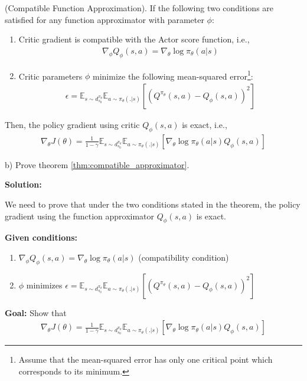 \begin{theorem}\label{thm:compatible_approximator}
    (Compatible Function Approximation). If the following two conditions are satisfied for any function approximator with parameter $\phi$:
    \begin{enumerate}
        \item Critic gradient is compatible with the Actor score function, i.e., 
        \begin{align*}
            \nabla_{\phi} Q_\phi(s, a) = \nabla_\theta \log \pi_\theta (a|s)
        \end{align*}
        \item Critic parameters $\phi$ minimize the following mean-squared error\footnote{Assume that the mean-squared error has only one critical point which corresponds to its minimum.}: 
        \begin{align*}
            \epsilon = \mathbb{E}_{s \sim d^{\pi_\theta}_{s_0}}\mathbb{E}_{a \sim \pi_\theta(.|s)} [(Q^{\pi_\theta} (s, a) - Q_\phi(s, a))^2]
        \end{align*}
    \end{enumerate}
    Then, the policy gradient using critic $Q_\phi(s, a)$ is exact, i.e., 
    \begin{align*}
            \nabla_\theta J(\theta) = \frac{1}{1-\gamma}\mathbb{E}_{s \sim d^{\pi_\theta}_{s_0}}\mathbb{E}_{a \sim \pi_\theta(.|s)} [\nabla_\theta \log \pi_\theta (a|s) Q_\phi (s, a)]
    \end{align*}
\end{theorem}

b) Prove theorem \ref{thm:compatible_approximator}.

\textbf{Solution:}

We need to prove that under the two conditions stated in the theorem, the policy gradient using the function approximator $Q_\phi(s,a)$ is exact.

\textbf{Given conditions:}
\begin{enumerate}
    \item $\nabla_{\phi} Q_\phi(s, a) = \nabla_\theta \log \pi_\theta (a|s)$ (compatibility condition)
    \item $\phi$ minimizes $\epsilon = \mathbb{E}_{s \sim d^{\pi_\theta}_{s_0}}\mathbb{E}_{a \sim \pi_\theta(.|s)} [(Q^{\pi_\theta} (s, a) - Q_\phi(s, a))^2]$
\end{enumerate}

\textbf{Goal:} Show that
\begin{align}
\nabla_\theta J(\theta) = \frac{1}{1-\gamma}\mathbb{E}_{s \sim d^{\pi_\theta}_{s_0}}\mathbb{E}_{a \sim \pi_\theta(.|s)} [\nabla_\theta \log \pi_\theta (a|s) Q_\phi (s, a)]
\end{align}

